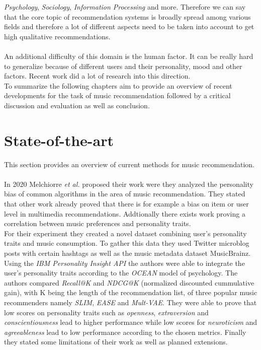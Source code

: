 \documentclass[runningheads,a4paper]{llncs}
\begin{document}
\textit{Psychology}, \textit{Sociology}, \textit{Information Processing} and more. 
Therefore we can say that the core topic of recommendation systems is broadly spread among various fields and therefore 
a lot of different aspects need to be taken into account to get high qualitative recommendations. \\
\\
An additional difficulty of this domain is the human factor. It can be really hard to generalize because of 
different users and their personality, mood and other factors. Recent work did a lot of research into this direction.\\
To summarize the following chapters aim to provide an overview of recent developments for the task of music recommendation 
followed by a critical discussion and evaluation as well as conclusion. 
\section{State-of-the-art}
This section provides an overview of current methods for music recommendation. \\
\\ 
In 2020 Melchiorre \textit{et al.} proposed their work were they analyzed the personality bias of common algorithms in the area of music recommendation.
They stated that other work already proved that there is for example a bias on item or user level in multimedia recommendations. 
Addtionally there exists work proving a correlation between music preferences and personality traits.\\
For their experiment they created a novel dataset combining user's personality traits and music consumption.
To gather this data they used Twitter microblog posts with certain hashtags as well as the music metadata dataset MusicBrainz. 
Using the \textit{IBM Personality Insight API} the authors were able to integrate the user's personality traits according to the \textit{OCEAN} model of psychology.
The authors compared \textit{Recall@K} and \textit{NDCG@K} (normalized discounted cummulative gain), with K being the length of the recommendation list, of three popular music recommenders namely \textit{SLIM}, \textit{EASE} and \textit{Mult-VAE}.
They were able to prove that low scores on personality traits such as \textit{openness}, \textit{extraversion} and \textit{conscientiousness} lead to higher performance
while low scores for \textit{neuroticism} and \textit{agreeableness} lead to low performance according to the chosen metrics. 
Finally they stated some limitations of their work as well as planned extensions. \cite{melchiorre2020personality}\\
\end{document}
